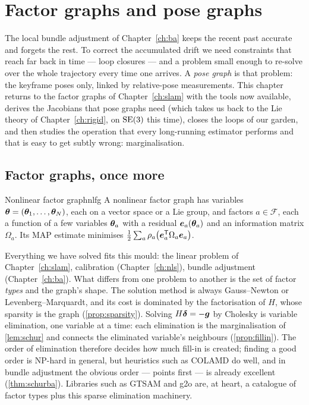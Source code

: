 \chapter{Factor graphs and pose graphs}
\label{ch:posegraph}

The local bundle adjustment of Chapter~\ref{ch:ba} keeps the recent past
accurate and forgets the rest. To correct the accumulated drift we need
constraints that reach far back in time --- loop closures --- and a
problem small enough to re-solve over the whole trajectory every time
one arrives. A \emph{pose graph} is that problem: the keyframe poses
only, linked by relative-pose measurements. This chapter returns to the
factor graphs of Chapter~\ref{ch:slam} with the tools now available,
derives the Jacobians that pose graphs need (which takes us back to the
Lie theory of Chapter~\ref{ch:rigid}, on $\mathrm{SE}(3)$ this time), closes the
loops of our garden, and then studies the operation that every
long-running estimator performs and that is easy to get subtly wrong:
marginalisation.

\section{Factor graphs, once more}

\begin{definition}{Nonlinear factor graph}{nlfg}
A nonlinear factor graph has variables $\bm{\theta}=(\bm{\theta}_1,\dots,
\bm{\theta}_N)$, each on a vector space or a Lie group, and factors
$a\in\mathcal{F}$, each a function of a few variables $\bm{\theta}_a$ with a
residual $\bm{e}_a(\bm{\theta}_a)$ and an information matrix $\Omega_a$.
Its MAP estimate minimises $\tfrac12\sum_a\rho_a\bigl(\bm{e}_a^{\mathsf{T}}
\Omega_a\bm{e}_a\bigr)$.
\end{definition}

Everything we have solved fits this mould: the linear problem of
Chapter~\ref{ch:slam}, calibration (Chapter~\ref{ch:nls}), bundle
adjustment (Chapter~\ref{ch:ba}). What differs from one problem to
another is the set of factor \emph{types} and the graph's shape. The
solution method is always Gauss--Newton or Levenberg--Marquardt, and its
cost is dominated by the factorisation of $H$, whose sparsity is the
graph (\cref{prop:sparsity}). Solving $H\bm{\delta}=-\bm{g}$ by
Cholesky is variable elimination, one variable at a time: each
elimination is the marginalisation of \cref{lem:schur} and connects the
eliminated variable's neighbours (\cref{prop:fillin}). The order of
elimination therefore decides how much fill-in is created; finding a good
order is NP-hard in general, but heuristics such as COLAMD do well, and
in bundle adjustment the obvious order --- points first --- is already
excellent (\cref{thm:schurba}). Libraries such as GTSAM and g2o are, at
heart, a catalogue of factor types plus this sparse elimination
machinery.

